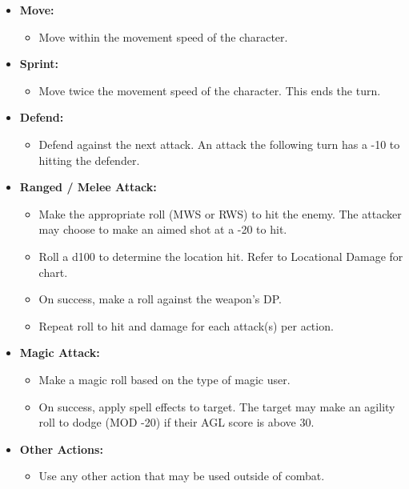 \documentclass[]{article}
\providecommand{\tightlist}{%
  \setlength{\itemsep}{0pt}\setlength{\parskip}{0pt}}
\begin{document}
\begin{itemize}
\tightlist
\item
  \textbf{Move:}

  \begin{itemize}
  \tightlist
  \item
    Move within the movement speed of the character.
  \end{itemize}
\item
  \textbf{Sprint:}

  \begin{itemize}
  \tightlist
  \item
    Move twice the movement speed of the character. This ends the turn.
  \end{itemize}
\item
  \textbf{Defend:}

  \begin{itemize}
  \tightlist
  \item
    Defend against the next attack. An attack the following turn has a
    -10 to hitting the defender.
  \end{itemize}
\item
  \textbf{Ranged / Melee Attack:}

  \begin{itemize}
  \tightlist
  \item
    Make the appropriate roll (MWS or RWS) to hit the enemy. The
    attacker may choose to make an aimed shot at a -20 to hit.
  \item
    Roll a d100 to determine the location hit. Refer to Locational
    Damage for chart.
  \item
    On success, make a roll against the weapon's DP.
  \item
    Repeat roll to hit and damage for each attack(s) per action.
  \end{itemize}
\item
  \textbf{Magic Attack:}

  \begin{itemize}
  \tightlist
  \item
    Make a magic roll based on the type of magic user.
  \item
    On success, apply spell effects to target. The target may make an
    agility roll to dodge (MOD -20) if their AGL score is above 30.
  \end{itemize}
\item
  \textbf{Other Actions:}

  \begin{itemize}
  \tightlist
  \item
    Use any other action that may be used outside of combat.
  \end{itemize}
\end{itemize}
\end{document}
